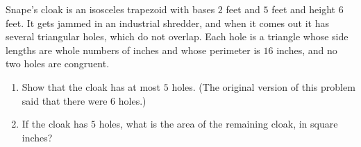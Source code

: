 Snape's cloak is an isosceles trapezoid with bases $2$ feet and $5$ feet and height $6$ feet. It gets jammed in an industrial shredder, and when it comes out it has several triangular holes, which do not overlap. Each hole is a triangle whose side lengths are whole numbers of inches and whose perimeter is $16$ inches, and no two holes are congruent.
\begin{enumerate}
\item[(a)] Show that the cloak has at most $5$ holes. (The original version of this problem said that there were $6$ holes.)
\item[(b)] If the cloak has $5$ holes, what is the area of the remaining cloak, in square inches?
\end{enumerate}

